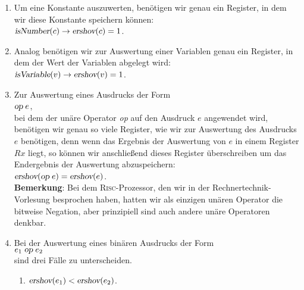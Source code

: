 \begin{enumerate}
\item Um eine Konstante auszuwerten, ben\"otigen wir genau ein Register, in dem wir diese
      Konstante speichern k\"onnen:
      \\[0.2cm]
      \hspace*{1.3cm}
      $\textsl{isNumber}(c) \rightarrow \textsl{ershov}(c) = 1$.
\item Analog ben\"otigen wir zur Auswertung einer Variablen genau ein Register, in dem der Wert der
      Variablen abgelegt wird:
      \\[0.2cm]
      \hspace*{1.3cm}
      $\textsl{isVariable}(v) \rightarrow \textsl{ershov}(v) = 1$.
\item Zur Auswertung eines Ausdrucks der Form
      \\[0.2cm]
      \hspace*{1.3cm}
      $\textsl{op}\; e$,
      \\[0.2cm] 
      bei dem der un\"are Operator \textsl{op} auf den Ausdruck $e$ angewendet wird, ben\"otigen wir
      genau so viele Register, wie wir zur Auswertung des Ausdrucks $e$ ben\"otigen, denn wenn das
      Ergebnis der Auswertung von $e$ in einem Register $Rx$ liegt, so k\"onnen wir anschlie{\ss}end
      dieses Register \"uberschreiben um das Endergebnis der Auswertung abzuspeichern:
      \\[0.2cm]
      \hspace*{1.3cm}
      $\textsl{ershov}(\textsl{op}\; e) = \textsl{ershov}(e)$.
      \\[0.2cm]
      \textbf{Bemerkung}: Bei dem \textsc{Risc}-Prozessor, den wir in der Rechnertechnik-Vorlesung
      besprochen haben, hatten wir als einzigen un\"aren Operator die bitweise Negation, aber
      prinzipiell sind auch andere un\"are Operatoren denkbar.
\item Bei der Auswertung eines bin\"aren Ausdrucks der Form
      \\[0.2cm]
      \hspace*{1.3cm}
      $e_1 \;\textsl{op}\; e_2$
      \\[0.2cm]
      sind drei F\"alle zu unterscheiden.
      \begin{enumerate}
      \item $\textsl{ershov}(e_1) < \textsl{ershov}(e_2)$.


\end{enumerate}
\end{enumerate}
